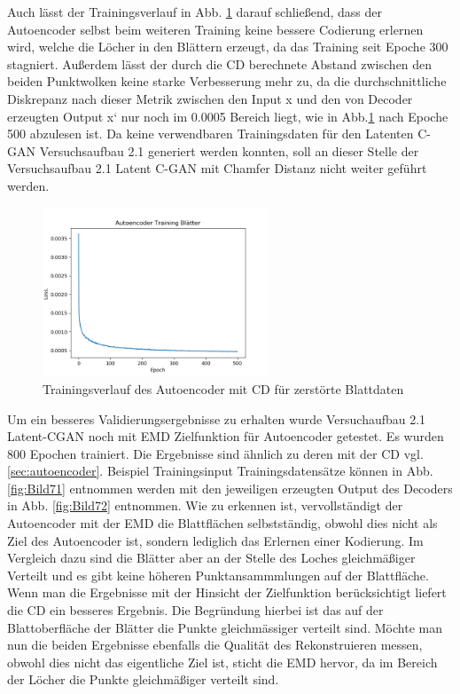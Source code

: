 \documentclass{llncs}
\begin{document}
Auch lässt der Trainingsverlauf in Abb. \ref{fig:Bild67} darauf schließend, dass der Autoencoder selbst beim weiteren Training keine bessere Codierung erlernen wird, welche die Löcher in den Blättern erzeugt, da das Training  seit Epoche 300 stagniert. Außerdem lässt der durch die CD berechnete Abstand zwischen den beiden Punktwolken keine starke Verbesserung mehr zu, da die durchschnittliche Diskrepanz nach dieser Metrik zwischen den Input x und den von Decoder erzeugten Output x` nur noch im 0.0005 Bereich liegt, wie in Abb.\ref{fig:Bild67} nach Epoche 500 abzulesen ist. Da keine verwendbaren Trainingsdaten für den Latenten C-GAN Versuchsaufbau 2.1 generiert werden konnten, soll an dieser Stelle der Versuchsaufbau 2.1 Latent C-GAN  mit Chamfer Distanz nicht weiter geführt werden. 
\begin{figure}[htbp] 
	\centering
	\includegraphics[width=0.6\textwidth]{autoencoder_training_blaetter_result.png}
	\caption{Trainingsverlauf des Autoencoder mit CD für zerstörte Blattdaten}
	\label{fig:Bild67}
\end{figure}
\pagebreak\linebreak 
Um ein besseres Validierungsergebnisse zu erhalten wurde Versuchaufbau 2.1 Latent-CGAN noch mit EMD Zielfunktion für Autoencoder getestet. Es wurden 800 Epochen trainiert. Die Ergebnisse sind ähnlich zu deren mit der CD vgl.\ref{sec:autoencoder}. Beispiel Trainingsinput Trainingsdatensätze können in Abb. \ref{fig:Bild71} entnommen werden mit den jeweiligen erzeugten Output des Decoders in Abb. \ref{fig:Bild72} entnommen. Wie zu erkennen ist, vervollständigt der Autoencoder mit der EMD die Blattflächen selbstständig, obwohl dies nicht als Ziel des Autoencoder ist, sondern lediglich das Erlernen einer Kodierung. Im Vergleich dazu sind die Blätter aber an der Stelle des Loches gleichmäßiger Verteilt und es gibt keine höheren Punktansammmlungen auf der Blattfläche. Wenn man die Ergebnisse mit der Hinsicht der Zielfunktion berücksichtigt liefert die CD ein besseres Ergebnis. Die Begründung hierbei ist das auf der Blattoberfläche der Blätter die Punkte gleichmässiger verteilt sind. Möchte man nun die beiden Ergebnisse ebenfalls die Qualität des Rekonstruieren messen, obwohl dies nicht das eigentliche Ziel ist, sticht die EMD hervor, da im Bereich der Löcher die Punkte gleichmäßiger verteilt sind.
\end{document}
